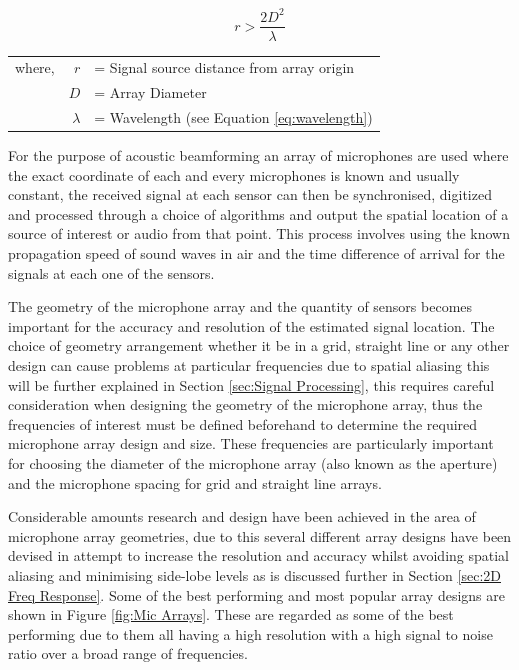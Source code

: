 \documentclass{UoNMCHA}
\numberwithin{equation}{section}
\begin{document}
    \begin{equation}
        r > \frac{2D^2}{\lambda}
        \label{eq:propogate}
    \end{equation}
    \begin{table}[H]
    \centering
        \begin{tabular}{lrl}
            where, & $r$ &= Signal source distance from array origin \\
             & $D$ &= Array Diameter \\
             & $\lambda$ &= Wavelength (see Equation \ref{eq:wavelength})
        \end{tabular}
    \end{table}
    
    For the purpose of acoustic beamforming an array of microphones are used where the exact coordinate of each and every microphones is known and usually constant, the received signal at each sensor can then be synchronised, digitized and processed through a choice of algorithms and output the spatial location of a source of interest or audio from that point. This process involves using the known propagation speed of sound waves in air and the time difference of arrival for the signals at each one of the sensors.
    
    The geometry of the microphone array and the quantity of sensors becomes important for the accuracy and resolution of the estimated signal location. The choice of geometry arrangement whether it be in a grid, straight line or any other design can cause problems at particular frequencies due to spatial aliasing this will be further explained in Section \ref{sec:Signal Processing}, this requires careful consideration when designing the geometry of the microphone array, thus the frequencies of interest must be defined beforehand to determine the required microphone array design and size. These frequencies are particularly important for choosing the diameter of the microphone array (also known as the aperture) and the microphone spacing for grid and straight line arrays.
    
    Considerable amounts research and design have been achieved in the area of microphone array geometries, due to this several different array designs have been devised in attempt to increase the resolution and accuracy whilst avoiding spatial aliasing and minimising side-lobe levels as is discussed further in Section \ref{sec:2D Freq Response}. Some of the best performing and most popular array designs are shown in Figure \ref{fig:Mic Arrays}. These are regarded as some of the best performing due to them all having a high resolution with a high signal to noise ratio over a broad range of frequencies.
    
\end{document}
